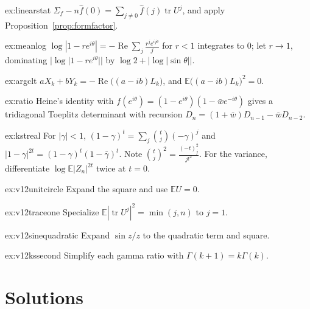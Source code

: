 \begin{hint}{ex:linearstat}
$\Sigma_f-n\hat f(0)=\sum_{j\ne0}\hat f(j)\operatorname{tr}U^j$, and apply Proposition~\ref{prop:formfactor}.
\end{hint}

\begin{hint}{ex:meanlog}
$\log|1-re^{i\theta}|=-\operatorname{Re}\sum_j\frac{r^je^{ij\theta}}j$ for $r<1$ integrates to $0$; let $r\to1$, dominating $|\log|1-re^{i\theta}||$ by $\log2+|\log|\sin\theta||$.
\end{hint}

\begin{hint}{ex:argclt}
$aX_k+bY_k=-\operatorname{Re}\bigl((a-ib)L_k\bigr)$, and $\mathbb E\bigl((a-ib)L_k\bigr)^2=0$.
\end{hint}

\begin{hint}{ex:ratio}
Heine's identity with $f(e^{i\theta})=(1-e^{i\theta})(1-\bar we^{-i\theta})$ gives a tridiagonal Toeplitz determinant with recursion $D_n=(1+\bar w)D_{n-1}-\bar wD_{n-2}$.
\end{hint}

\begin{hint}{ex:kstreal}
For $|\gamma|<1$, $(1-\gamma)^t=\sum_j\binom tj(-\gamma)^j$ and $|1-\gamma|^{2t}=(1-\gamma)^t(1-\bar\gamma)^t$. Note $\binom tj^2=\frac{(-t)_j^2}{j!^2}$. For the variance, differentiate $\log\mathbb E|Z_n|^{2t}$ twice at $t=0$.
\end{hint}

\begin{hint}{ex:v12unitcircle}
Expand the square and use $\mathbb EU=0$.
\end{hint}

\begin{hint}{ex:v12traceone}
Specialize $\mathbb E|\operatorname{tr}U^j|^2=\min(j,n)$ to $j=1$.
\end{hint}

\begin{hint}{ex:v12sinequadratic}
Expand $\sin z/z$ to the quadratic term and square.
\end{hint}

\begin{hint}{ex:v12kssecond}
Simplify each gamma ratio with $\Gamma(k+1)=k\Gamma(k)$.
\end{hint}

\section{Solutions}

